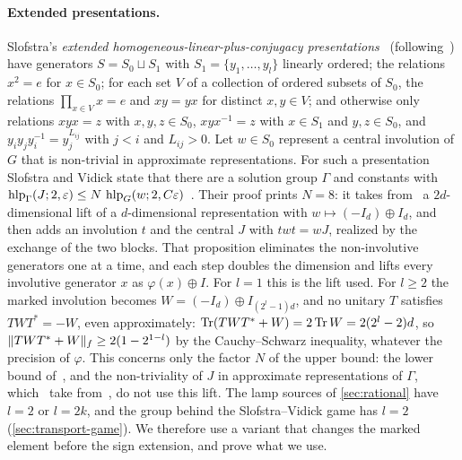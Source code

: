 \paragraph{Extended presentations.} Slofstra's \emph{extended homogeneous-linear-plus-conjugacy presentations}~\cite[Section~6]{SV18}
(following~\cite{Slo19}) have generators $S=S_0\sqcup S_1$ with $S_1=\{y_1,\dots,y_l\}$ linearly ordered; the relations
$x^2=e$ for $x\in S_0$; for each set $V$ of a collection of ordered subsets of $S_0$, the relations $\prod_{x\in V}x=e$ and
$xy=yx$ for distinct $x,y\in V$; and otherwise only relations $xyx=z$ with $x,y,z\in S_0$, $xyx^{-1}=z$ with $x\in S_1$ and
$y,z\in S_0$, and $y_iy_jy_i^{-1}=y_j^{L_{ij}}$ with $j<i$ and $L_{ij}>0$. Let $w\in S_0$ represent a central involution of $G$
that is non-trivial in approximate representations. For such a presentation Slofstra and Vidick state that there are a
solution group $\Gamma$ and constants with $\operatorname{hlp}_\Gamma(J;2,\varepsilon)\le N\,\operatorname{hlp}_G(w;2,C\varepsilon)$~\cite[Proposition~6.2]{SV18}. Their proof
prints $N=8$: it takes from~\cite[Proposition~4.8]{Slo19} a $2d$-dimensional lift of a $d$-dimensional representation with
$w\mapsto(-I_d)\oplus I_d$, and then adds an involution $t$ and the central $J$ with $twt=wJ$, realized by the exchange of the two
blocks. That proposition eliminates the non-involutive generators one at a time, and each step doubles the dimension and lifts
every involutive generator $x$ as $\varphi(x)\oplus I$. For $l=1$ this is the lift used. For $l\ge2$ the marked involution becomes
$W=(-I_d)\oplus I_{(2^l-1)d}$, and no unitary $T$ satisfies $TWT^*=-W$, even approximately: $\operatorname{Tr}(TWT^*+W)=2\operatorname{Tr} W=2(2^l-2)d$, so
$\lVert TWT^*+W\rVert_{f}\ge2(1-2^{1-l})$ by the Cauchy--Schwarz inequality, whatever the precision of $\varphi$. This concerns only the factor $N$ of the upper bound: the
lower bound of~\cite[Proposition~6.2]{SV18}, and the non-triviality of $J$ in approximate representations of $\Gamma$,
which~\cite{SV18} take from~\cite[Lemma~5.2]{Slo19}, do not use this lift. The lamp sources of \cref{sec:rational} have
$l=2$ or $l=2k$, and the group behind the Slofstra--Vidick game has $l=2$ (\cref{sec:transport-game}). We therefore use a variant
that changes the marked element before the sign extension, and prove what we use.

